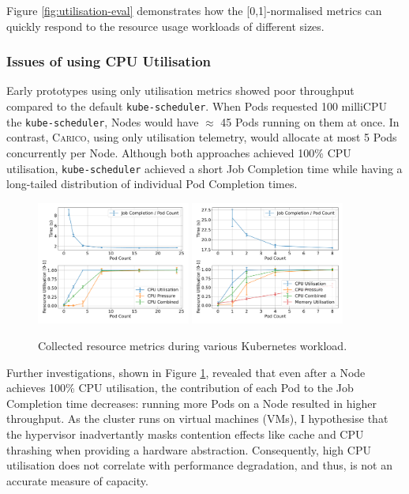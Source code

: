 Figure \ref{fig:utilisation-eval} demonstrates how the [0,1]-normalised
metrics can quickly respond to the resource usage workloads of different sizes.

\subsubsection{Issues of using CPU Utilisation}
\label{sec:issue-with-util}
Early prototypes using only utilisation metrics showed poor throughput compared
to the default \verb|kube-scheduler|. When Pods requested
100 milliCPU the \verb|kube-scheduler|, Nodes would have $\approx$ 45
Pods running on them at once. In contrast, \textsc{Carico}, using only utilisation
telemetry, would allocate at most 5 Pods concurrently per Node. Although both
approaches achieved 100\% CPU utilisation, \verb|kube-scheduler| achieved a
short Job Completion time while having a long-tailed distribution of individual
Pod Completion times.

\begin{figure}[H]
    \centering
    \includegraphics[width=0.45\textwidth]{images/podcount-util-pressure.pdf}
    \includegraphics[width=0.45\textwidth]{images/ml-podcount-util-pressure.pdf}
    \caption{Collected resource metrics during various Kubernetes workload.}
    \label{fig:podcount-util-pressure}
\end{figure}

Further investigations, shown in Figure \ref{fig:podcount-util-pressure},
revealed that even after a Node achieves 100\% CPU utilisation, the contribution
of each Pod to the Job Completion time decreases: running more Pods on a Node
resulted in higher throughput. As the cluster runs on virtual machines (VMs), I
hypothesise that the hypervisor inadvertantly masks contention effects like
cache and CPU thrashing when providing a hardware abstraction. Consequently,
high CPU utilisation does not correlate with performance degradation, and thus,
is not an accurate measure of capacity.

